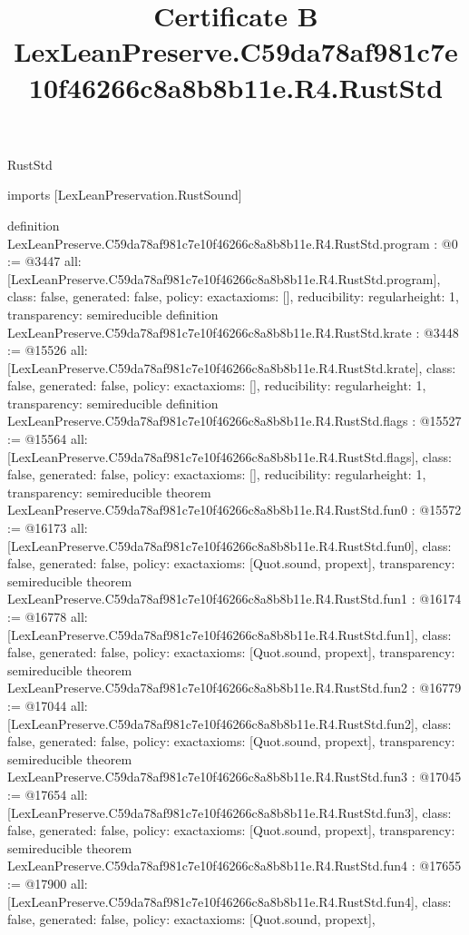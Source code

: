 \begin{lexlean}{RustStd}
\title{Certificate B LexLeanPreserve.C59da78af981c7e10f46266c8a8b8b11e.R4.RustStd}
\begin{coremodule}
imports [LexLeanPreservation.RustSound]

definition LexLeanPreserve.C59da78af981c7e10f46266c8a8b8b11e.R4.RustStd.program : @0 := @3447 {
  all: [LexLeanPreserve.C59da78af981c7e10f46266c8a8b8b11e.R4.RustStd.program],
  class: false,
  generated: false,
  policy: exact{axioms: []},
  reducibility: regular{height: 1},
  transparency: semireducible
}
definition LexLeanPreserve.C59da78af981c7e10f46266c8a8b8b11e.R4.RustStd.krate : @3448 := @15526 {
  all: [LexLeanPreserve.C59da78af981c7e10f46266c8a8b8b11e.R4.RustStd.krate],
  class: false,
  generated: false,
  policy: exact{axioms: []},
  reducibility: regular{height: 1},
  transparency: semireducible
}
definition LexLeanPreserve.C59da78af981c7e10f46266c8a8b8b11e.R4.RustStd.flags : @15527 := @15564 {
  all: [LexLeanPreserve.C59da78af981c7e10f46266c8a8b8b11e.R4.RustStd.flags],
  class: false,
  generated: false,
  policy: exact{axioms: []},
  reducibility: regular{height: 1},
  transparency: semireducible
}
theorem LexLeanPreserve.C59da78af981c7e10f46266c8a8b8b11e.R4.RustStd.fun0 : @15572 := @16173 {
  all: [LexLeanPreserve.C59da78af981c7e10f46266c8a8b8b11e.R4.RustStd.fun0],
  class: false,
  generated: false,
  policy: exact{axioms: [Quot.sound, propext]},
  transparency: semireducible
}
theorem LexLeanPreserve.C59da78af981c7e10f46266c8a8b8b11e.R4.RustStd.fun1 : @16174 := @16778 {
  all: [LexLeanPreserve.C59da78af981c7e10f46266c8a8b8b11e.R4.RustStd.fun1],
  class: false,
  generated: false,
  policy: exact{axioms: [Quot.sound, propext]},
  transparency: semireducible
}
theorem LexLeanPreserve.C59da78af981c7e10f46266c8a8b8b11e.R4.RustStd.fun2 : @16779 := @17044 {
  all: [LexLeanPreserve.C59da78af981c7e10f46266c8a8b8b11e.R4.RustStd.fun2],
  class: false,
  generated: false,
  policy: exact{axioms: [Quot.sound, propext]},
  transparency: semireducible
}
theorem LexLeanPreserve.C59da78af981c7e10f46266c8a8b8b11e.R4.RustStd.fun3 : @17045 := @17654 {
  all: [LexLeanPreserve.C59da78af981c7e10f46266c8a8b8b11e.R4.RustStd.fun3],
  class: false,
  generated: false,
  policy: exact{axioms: [Quot.sound, propext]},
  transparency: semireducible
}
theorem LexLeanPreserve.C59da78af981c7e10f46266c8a8b8b11e.R4.RustStd.fun4 : @17655 := @17900 {
  all: [LexLeanPreserve.C59da78af981c7e10f46266c8a8b8b11e.R4.RustStd.fun4],
  class: false,
  generated: false,
  policy: exact{axioms: [Quot.sound, propext]},
}
\end{coremodule}
\end{lexlean}
